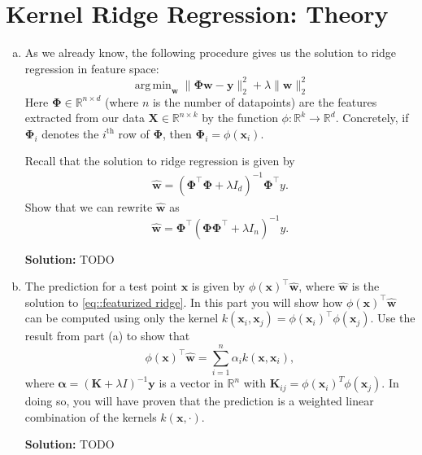 \documentclass{article}
\newcommand{\Question}[1]{\Large \section{ #1 } \normalsize}
\newcommand{\w}{\vec{w}}
\newcommand{\x}{\vec{x}}
\newcommand{\y}{\vec{y}}
\DeclareMathOperator*{\argmin}{arg\,min}
\newcommand{\mat}[1]{\mathbf{#1}}
\renewcommand{\vec}[1]{\boldsymbol{\mathbf{#1}}}
\newenvironment{solution}{\color{blue} \smallskip \textbf{Solution:}}{}
\begin{document}
\clearpage
\Question{Kernel Ridge Regression: Theory}
\begin{enumerate}[(a)]
\item As we already know, the following procedure gives us the
solution to ridge regression in feature space:
\begin{equation}
\label{eq::featurized ridge}
\argmin_{\w} \|\mat{\Phi}\w - \y\|_2^2 + \lambda\|\w\|_2^2 
\end{equation}
Here $\mat{\Phi} \in \mathbb{R}^{n \times d}$ (where $n$ is the number of datapoints) are the features extracted from our data $\mat{X} \in \mathbb{R}^{n \times k}$ by the function $\phi\colon \mathbb{R}^{k} \rightarrow \mathbb{R}^{d}$. Concretely, if $\mat{\Phi}_{i}$ denotes the $i^{\text{th}}$ row of $\mat{\Phi}$, then $\mat{\Phi}_{i} = \phi(\mat{x}_{i})$. 

Recall that the solution to ridge regression is given by
\begin{align*}
  \hat{\w} = (\mat{\Phi}^\top \mat{\Phi} + \lambda I_d)^{-1} \mat{\Phi}^\top y.
\end{align*}
Show that we can rewrite $\hat{\w}$ as
\[
\hat{\w} = \mat{\Phi}^\top (\mat{\Phi} \mat{\Phi}^\top + \lambda I_n)^{-1} y.
\]

\begin{solution}
TODO
\end{solution}

\clearpage
\item
The prediction for a test point $\x$ is given by $\phi(\x)^\top \hat{\w}$, where $\hat{\w}$ is the solution to \eqref{eq::featurized ridge}.
In this part you will show how $\phi(\x)^\top \hat{\w}$ can be computed
using only the kernel $k(\x_i, \x_j) = \phi(\x_i)^\top \phi(\x_j)$. Use the result from part (a) to show that 
\[
\phi(\x)^\top \hat{\w} = \sum_{i=1}^n \alpha_i k(\x, \x_i),
\]
where $\vec{\alpha} = (\mat{K} + \lambda I)^{-1}\y$ is a vector in $\mathbb{R}^{n}$ with $\mat{K}_{ij} = \phi(\vec{x}_i)^{T}\phi(\vec{x}_j)$. In doing so, you will have proven that the prediction is a weighted linear combination of the kernels $k(\vec{x},  \cdot)$.
 
\begin{solution}
TODO
\end{solution}
\end{enumerate}
\end{document}
